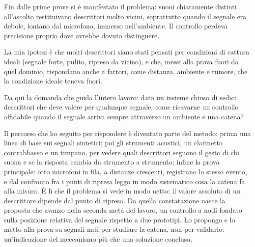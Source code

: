 \documentclass{article}
\begin{document}
Fin dalle prime prove si è manifestato il problema: suoni chiaramente distinti all'ascolto restituivano descrittori molto vicini, soprattutto quando il segnale era debole, lontano dal microfono, immerso nell'ambiente. Il controllo perdeva precisione proprio dove avrebbe dovuto distinguere.


La mia ipotesi è che molti descrittori siano stati pensati per condizioni di cattura ideali (segnale forte, pulito, ripreso da vicino), e che, messi alla prova fuori da quel dominio, rispondano anche a fattori, come distanza, ambiente e rumore, che la condizione ideale teneva fuori.

Da qui la domanda che guida l'intero lavoro: dato un insieme chiuso di sedici descrittori che deve valere per qualunque segnale, come ricavarne un controllo affidabile quando il segnale arriva sempre attraverso un ambiente e una catena?

Il percorso che ho seguito per rispondere è diventato parte del metodo: %
 prima una linea di base sui segnali sintetici; %
 poi gli strumenti acustici, un clarinetto contrabbasso e un timpano, per vedere quali descrittori seguono il gesto di chi suona e se la risposta cambia da strumento a strumento; infine la prova principale: otto microfoni in fila, a distanze crescenti, registrano lo stesso evento, e dal confronto fra i punti di ripresa leggo in modo sistematico cosa la catena fa alla misura. È lì che il problema si vede in modo netto: il valore assoluto di un descrittore dipende dal punto di ripresa. Da quella constatazione nasce la proposta che avanzo nella seconda metà del lavoro, un controllo a nodi fondato sulla posizione relativa del segnale rispetto a due prototipi. Lo propongo e lo metto alla prova su segnali nati per studiare la catena, non per validarlo: un'indicazione del meccanismo più che una soluzione conclusa.
\end{document}
